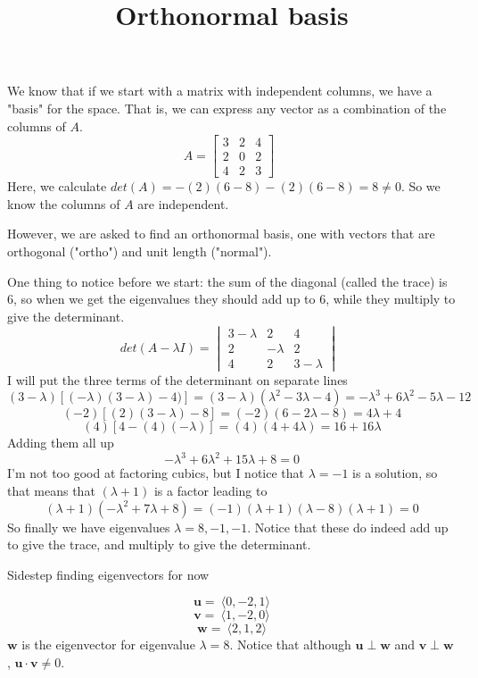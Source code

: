 \documentclass[11pt, oneside]{article}
\title{Orthonormal basis}
\date{}
\begin{document}
\maketitle
\Large

We know that if we start with a matrix with independent columns, we have a "basis" for the space.  That is, we can express any vector as a combination of the columns of $A$.
\[
A=
\begin{bmatrix} 
  3  &  2  &  4 \\ 
  2  &  0  &  2 \\
  4  &  2  &  3
\end{bmatrix} \ \ 
\]
Here, we calculate $det(A) = -(2)(6-8) - (2)(6-8) = 8 \ne 0$.  So we know the columns of $A$ are independent.

However, we are asked to find an orthonormal basis, one with vectors that are orthogonal ("ortho") and unit length ("normal").

One thing to notice before we start:  the sum of the diagonal (called the trace) is $6$, so when we get the eigenvalues they should add up to $6$, while they multiply to give the determinant.
\[
det(A- \lambda I) = 
\begin{vmatrix} 
  3 - \lambda  &  2  &  4 \\ 
  2  &  - \lambda  &  2 \\
  4  &  2  &  3 - \lambda
\end{vmatrix} \ \ 
\]
I will put the three terms of the determinant on separate lines
\[ (3-\lambda)[(-\lambda)(3-\lambda) - 4)] = (3-\lambda)(\lambda^2 - 3\lambda - 4) =  -\lambda^3 + 6\lambda^2 - 5\lambda - 12 \]
\[ (-2)[(2)(3-\lambda) - 8] = (-2)(6 - 2\lambda - 8) = 4\lambda + 4\]
\[ (4)[4 - (4)(-\lambda)] = (4)(4 + 4 \lambda) = 16 + 16 \lambda \]
Adding them all up
\[ - \lambda^3 + 6 \lambda^2 + 15 \lambda + 8 = 0\]
I'm not too good at factoring cubics, but I notice that $\lambda = -1$ is a solution, so that means that $(\lambda + 1)$ is a factor leading to
\[ (\lambda + 1)(-\lambda^2 + 7\lambda + 8) = (-1)(\lambda + 1)(\lambda-8)(\lambda + 1) = 0 \]
So finally we have eigenvalues $\lambda = 8, -1, -1$.  Notice that these do indeed add up to give the trace, and multiply to give the determinant.

Sidestep finding eigenvectors for now

\[ \mathbf{u} = \  \langle 0,-2,1 \rangle  \]
\[ \mathbf{v} = \  \langle 1,-2,0 \rangle  \]
\[ \mathbf{w} = \  \langle 2,1,2 \rangle   \]
$\mathbf{w}$ is the eigenvector for eigenvalue $\lambda = 8$.
Notice that although $\mathbf{u} \perp \mathbf{w}$ and $\mathbf{v} \perp \mathbf{w}$, $\mathbf{u} \cdot \mathbf{v} \ne 0$.  
\end{document}
